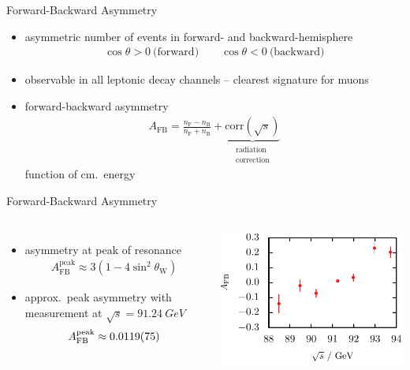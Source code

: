 \documentclass[11pt,xcolor=dvipsnames,professionalfonts]{beamer}
\begin{document}
\begin{frame}{Forward-Backward Asymmetry}
	\begin{itemize}
		\setlength\itemsep{1.5em}
		\item<1-> asymmetric number of events in forward- and backward-hemisphere
		\begin{align*}
			\cos\theta > 0~\text{(forward)} \qquad \cos\theta < 0~\text{(backward)}
		\end{align*}
		
		\item<2-> observable in all leptonic decay channels -- clearest signature for muons
		
		
		\item<3-> forward-backward asymmetry
			\begin{align*}
				A_\mathrm{FB} = \frac{n_\mathrm{F} - n_\mathrm{B}}{n_\mathrm{F} + n_\mathrm{B}} + \underbrace{\mathrm{corr}(\sqrt{s})}_{\substack{\text{radiation} \\ \text{correction}}}
			\end{align*}
			function of cm.\ energy
	\end{itemize}
\end{frame}

\begin{frame}{Forward-Backward Asymmetry}
	\begin{columns}
		\begin{itemize}
			\setlength\itemsep{1.5em}
			\item<2-> asymmetry at peak of resonance
			\begin{align*}
				A_\mathrm{FB}^\mathrm{peak} \approx 3\left( 1 - 4 \sin^2\theta_\mathrm{W} \right)
			\end{align*}
			
			\item<3-> approx.\ peak asymmetry with measurement at $\sqrt{s} = \SI{91.24}{GeV}$
			\begin{align*}
			A_\mathrm{FB}^\mathrm{peak} \approx \num{0.0119 +- 0.0075}
			\end{align*}
		\end{itemize}
			\begin{center}
				\includegraphics{./talkfigs/pdf/afb.pdf}
			\end{center}
	\end{columns}

\end{frame}
\end{document}
